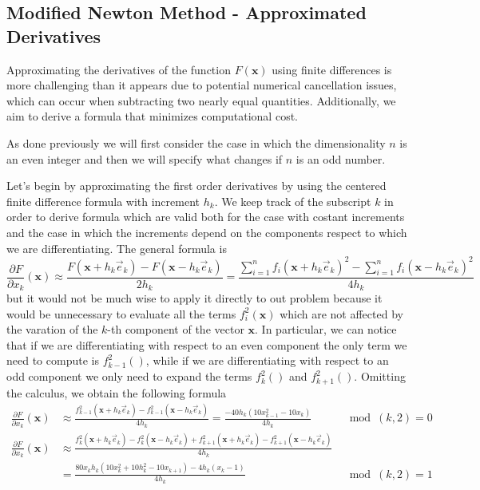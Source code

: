 \medskip
\subsection*{Modified Newton Method - Approximated Derivatives}
Approximating the derivatives of the function $F(\mathbf{x})$ using finite differences is more challenging than it appears due to potential numerical cancellation issues, which can occur when subtracting two nearly equal quantities. Additionally, we aim to derive a formula that minimizes computational cost.

As done previously we will first consider the case in which the dimensionality $n$ is an even integer and then we will specify what changes if $n$ is an odd number.

Let's begin by approximating the first order derivatives by using the centered finite difference formula with increment $h_k$. We keep track of the subscript $k$ in order to derive formula which are valid both for the case with costant increments and the case in which the increments depend on the components respect to which we are differentiating.
The general formula is
$$ \frac{\partial F }{\partial x_k} (\mathbf{x}) \approx \frac{F(\mathbf{x} + h_k \vec{e}_k) - F(\mathbf{x} - h_k \vec{e}_k)}{2h_k} = 
\frac{\sum_{i = 1}^{n} f_i(\mathbf{x} + h_k \vec{e}_k)^2 - \sum_{i = 1}^{n} f_i(\mathbf{x} - h_k \vec{e}_k)^2}{4h_k}$$
but it would not be much wise to apply it directly to out problem because it would be unnecessary to evaluate all the terms $f_i^2(\mathbf{x})$ which are not affected by the varation of the $k$-th component of the vector $\mathbf{x}$.
In particular, we can notice that if we are differentiating with respect to an even component the only term we need to compute is $f_{k-1}^2()$, while if we are differentiating with respect to an odd component we only need to expand the terms $f_k^2()$ and $f_{k+1}^2()$.
Omitting the calculus, we obtain the following formula
\begin{align*}
    \frac{\partial F}{\partial x_k} (\mathbf{x}) &\approx \frac{f_{k-1}^2(\mathbf{x} + h_k \vec{e}_k) - f_{k-1}^2(\mathbf{x} - h_k \vec{e}_k)}{4h_k} = \frac{- 40h_k (10x_{k-1}^2 - 10x_k)}{4h_k} \quad  &\mod(k,2)  = 0 \\
    \frac{\partial F}{\partial x_k} (\mathbf{x}) &\approx \frac{f_{k}^2(\mathbf{x} + h_k \vec{e}_k) - f_{k}^2(\mathbf{x} - h_k \vec{e}_k) + f_{k+1}^2(\mathbf{x} + h_k \vec{e}_k) - f_{k+1}^2(\mathbf{x} - h_k \vec{e}_k)}{4h_k} \\ &= \frac{80x_k h_k (10x_k^2 + 10 h_k^2 -10x_{k+1}) - 4h_k (x_k -1)}{4h_k} \quad &\mod(k,2) = 1
\end{align*}

